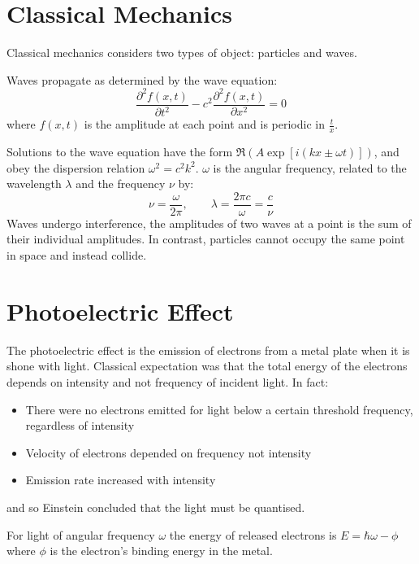 \documentclass[../Main.tex]{subfiles}
\begin{document}
\section{Classical Mechanics}
Classical mechanics considers two types of object: particles and waves.

Waves propagate as determined by the wave equation:
\begin{equation*}
    \frac{\partial^{2}f(x, t)}{\partial t^{2}} - c^2 \frac{\partial^{2}f(x, t)}{\partial x^{2}} = 0
\end{equation*}
where $f(x, t)$ is the amplitude at each point and is periodic in $\frac{t}{x}$.

Solutions to the wave equation have the form $\Re\left(A \exp[i(kx \pm \omega t)]\right)$, and obey the dispersion relation $\omega^2 = c^2 k^2$. $\omega$ is the angular frequency, related to the wavelength $\lambda$ and the frequency $\nu$ by:
\begin{equation*}
    \nu = \frac{\omega}{2\pi},\qquad \lambda = \frac{2\pi c}{\omega} = \frac{c}{\nu}
\end{equation*}
Waves undergo interference, the amplitudes of two waves at a point is the sum of their individual amplitudes. In contrast, particles cannot occupy the same point in space and instead collide.
\section{Photoelectric Effect}
The photoelectric effect is the emission of electrons from a metal plate when it is shone with light. Classical expectation was that the total energy of the electrons depends on intensity and not frequency of incident light. In fact:
\begin{itemize}
    \item There were no electrons emitted for light below a certain threshold frequency, regardless of intensity
    \item Velocity of electrons depended on frequency not intensity
    \item Emission rate increased with intensity
\end{itemize}
and so Einstein concluded that the light must be quantised.

For light of angular frequency $\omega$ the energy of released electrons is $E = \hbar \omega - \phi$ where $\phi$ is the electron's binding energy in the metal.
\end{document}
